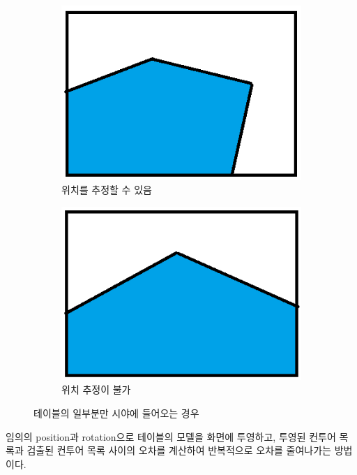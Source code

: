 \documentclass[10pt]{oblivoir}
\begin{document}
\begin{figure}[h]
    \centering
    \begin{subfigure}{0.4\textwidth}
        \includegraphics[width=\textwidth]{img/partial-table-valid-case.png}
        \caption{위치를 추정할 수 있음}
    \end{subfigure}
    \centering
    \begin{subfigure}{0.4\textwidth}
        \includegraphics[width=\textwidth]{img/partial-table-invalid-case.png}
        \caption{위치 추정이 불가}
    \end{subfigure}
    \caption{테이블의 일부분만 시야에 들어오는 경우}
\end{figure}

임의의 position과 rotation으로 테이블의 모델을 화면에 투영하고, 투영된 컨투어 목록과 검출된 컨투어 목록 사이의 오차를 계산하여 반복적으로 오차를 줄여나가는 방법이다.
\end{document}
